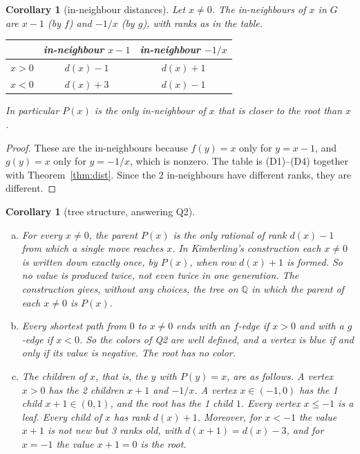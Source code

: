 \documentclass[11pt]{article}
\newtheorem{corollary}[theorem]{Corollary}
\theoremstyle{definition}
\theoremstyle{remark}
\newcommand{\Q}{\mathbb{Q}}
\begin{document}
\begin{corollary}[in-neighbour distances]\label{cor:innbr}
Let $x\neq0$. The in-neighbours of $x$ in $G$ are $x-1$ (by $f$) and $-1/x$ (by $g$), with ranks
as in the table.
\begin{center}
\begin{tabular}{c c c}
\toprule
 & \emph{in-neighbour } $x-1$ & \emph{in-neighbour } $-1/x$\\
\midrule
$x>0$ & $d(x)-1$ & $d(x)+1$\\
$x<0$ & $d(x)+3$ & $d(x)-1$\\
\bottomrule
\end{tabular}
\end{center}
In particular $P(x)$ is the only in-neighbour of $x$ that is closer to the root than $x$.
\end{corollary}

\begin{proof}
These are the in-neighbours because $f(y)=x$ only for $y=x-1$, and $g(y)=x$ only for $y=-1/x$,
which is nonzero. The table is (D1)--(D4) together with Theorem~\ref{thm:dist}. Since the 2
in-neighbours have different ranks, they are different.
\end{proof}

\begin{corollary}[tree structure, answering Q2]\label{cor:tree}
\begin{enumerate}[(a)]
\item For every $x\neq0$, the parent $P(x)$ is the only rational of rank $d(x)-1$ from which a
single move reaches $x$. In Kimberling's construction each $x\neq0$ is written down exactly once,
by $P(x)$, when row $d(x)+1$ is formed. So no value is produced twice, not even twice in one
generation. The construction gives,
without any choices, the tree on $\Q$ in which the parent of each $x\neq0$ is $P(x)$.
\item Every shortest path from $0$ to $x\neq0$ ends with an $f$-edge if $x>0$ and with a $g$-edge
if $x<0$. So the colors of Q2 are well defined, and \emph{a vertex is blue if and only if its value
is negative}. The root has no color.
\item The \emph{children} of $x$, that is, the $y$ with $P(y)=x$, are as follows. A vertex $x>0$
has the 2 children $x+1$ and $-1/x$. A vertex $x\in(-1,0)$ has the 1 child $x+1\in(0,1)$, and
the root has the 1 child $1$. Every vertex $x\le-1$ is a leaf. Every child of $x$ has rank
$d(x)+1$. Moreover, for $x<-1$ the value $x+1$ is not new but \emph{3 ranks old}, with
$d(x+1)=d(x)-3$, and for $x=-1$ the value $x+1=0$ is the root.
\end{enumerate}
\end{corollary}
\end{document}
